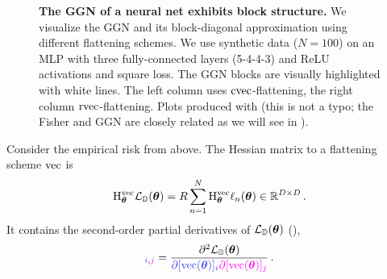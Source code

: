 \begin{figure}[!h]
\begin{minipage}[t]{0.495\linewidth}
  \end{minipage}
  \caption{\textbf{The GGN of a neural net exhibits block structure.}
    We visualize the GGN and its block-diagonal approximation using different flattening schemes.
    We use synthetic data ($N=100$) on an MLP with three fully-connected layers (5-4-4-3) and ReLU activations and square loss.
    The GGN blocks are visually highlighted with white lines.
    The left column uses $\cvec$-flattening, the right column $\rvec$-flattening.
    Plots produced with 
    (this is not a typo; the Fisher and GGN are closely related as we will see in ).
  }\label{fig:ggn-block-structure}
\end{figure}

\switchcolumn[0]
Consider the empirical risk from above.
The Hessian matrix \wrt to a flattening scheme $\vec$ is
\begin{align*}
  \hess_{\vtheta}^{\vec} \gL_{\sD}(\vtheta)
  =
  R
  \sum_{n=1}^N
  \hess_{\vtheta}^{\vec} \ell_n(\vtheta) \in \sR^{D \times D}\,.
\end{align*}
It contains the second-order partial derivatives of $\gL_{\sD}(\vtheta)$ (), \ie
\begin{align*}
  [\hess_{\vtheta}^{\vec} \gL_{\sD}(\vtheta)]_{\colored{i},\colored[VectorPink]{j}}
  =
  \frac{\partial^2 \gL_{\sD}(\vtheta)}{\colored{\partial [\vec(\vtheta)]_i} \colored[VectorPink]{\partial [\vec(\vtheta)]_j}}\,.
\end{align*}

